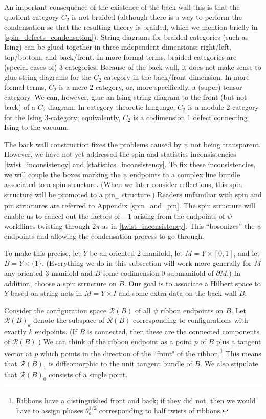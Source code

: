 \documentclass[12pt,a4paper]{article}
\newcommand{\mcr}{\mathcal{R}}
\newcommand{\bd}{\partial}
\begin{document}
An important consequence of the existence of the back wall this is that the quotient category $C_2$ 
is not braided (although there is a way to perform the condensation so that the resulting theory is 
braided, which we mention briefly in \ref{spin_defects_condensation}).
String diagrams for braided categories (such as Ising) can be glued together in three independent 
dimensions: right/left, top/bottom, and back/front.
In more formal terms, braided categories are (special cases of) 3-categories.
Because of the back wall, it does not make sense to glue string diagrams for the $C_2$ category in the back/front
dimension.
In more formal terms, $C_2$ is a mere 2-category, or, more specifically, a (super) tensor category.
We can, however, glue an Ising string diagram to the front (but not back) of a $C_2$ diagram.
In category theoretic language, $C_2$ is a module 2-category for the Ising 3-category; equivalently, $C_2$ is a codimension 1 defect
connecting Ising to the vacuum.


\medskip

The back wall construction fixes the problems caused by $\psi$ not being transparent.
However, we have not yet addressed the spin and statistics 
inconsistencies \eqref{twist_inconsistency} and \eqref{statistics_inconsistency}.
To fix these inconsistencies, we will couple the boxes marking the $\psi$ endpoints to a 
complex line bundle associated to a spin structure. 
(When we later consider reflections, this spin structure will be promoted to a $\mbox{pin}_+$ structure.)
Readers unfamiliar with spin and pin structures are referred to Appendix \ref{spin_and_pin}. 
The spin structure will enable us to cancel out the factors of $-1$ 
arising from the endpoints of $\psi$ worldlines twisting through $2\pi$ as in \eqref{twist_inconsistency}.
This ``bosonizes'' the $\psi$ endpoints and allowing the condensation process to go through. 


\medskip

To make this precise, let $Y$ be an oriented 2-manifold, let $M = Y\times [0,1]$, and let $B = Y\times \{1\}$.
(Everything we do in this subsection will work more generally for $M$ any oriented 
3-manifold and $B$ some codimension 0 submanifold
of $\bd M$.)
In addition, choose a spin structure on $B$.
Our goal is to associate a Hilbert space to $Y$ based on string nets in $M = Y\times I$
and some extra data on the back wall $B$.

Consider the configuration space $\mcr(B)$ of all $\psi$ ribbon endpoints on $B$.
Let $\mcr(B)_k$ denote the subspace of $\mcr(B)$ corresponding to configurations with exactly $k$ endpoints.
(If $B$ is connected, then these are the connected components of $\mcr(B)$.)
We can think of the ribbon endpoint as a point $p$ of $B$ plus a tangent vector at $p$ which
points in the direction of the ``front" of the ribbon.\footnote{Ribbons 
have a distinguished front and back; if they did not, then we would have to assign
phases $\theta_a^{1/2}$ corresponding to half twists of ribbons.}
This means that $\mcr(B)_1$ is diffeomorphic to the unit tangent bundle of $B$.
We also stipulate that $\mcr(B)_0$ consists of a single point.
\end{document}
